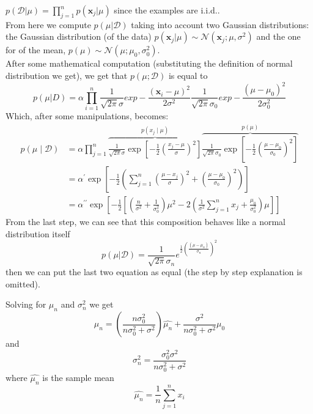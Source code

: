 $p(\mathcal{D}|\mu)=\prod_{j=1}^{n}p(\pmb{x}_{j}|\mu)$ since the examples are i.i.d..\\

From here we compute $p(\mu|\mathcal{D})$ taking into account two Gaussian distributions:
the Gaussian distribution (of the data)
$p(\pmb{x}_{j}| \mu) \sim \mathcal{N}(\pmb{x}_{j}; \mu, \sigma^{2})$ and the one
for of the mean, $p(\mu) \sim \mathcal{N}(\mu ; \mu_{0}, \sigma_{0}^{2})$.\\ After
some mathematical computation (substituting the definition of normal
distribution we get), we get that $p(\mu;\mathcal{D})$ is equal to
\[
	p(\mu | D) = \alpha \prod_{i=1}^{n}\frac{1}{\sqrt{2 \pi} \sigma}\mathit{exp}- \frac{(\pmb{x}_{i}-\mu)^{2}}{2
	\sigma^{2}}\frac{1}{\sqrt{2 \pi}\sigma_{0}}\mathit{exp}- \frac{(\mu - \mu_{0})^{2}}{2
	\sigma_{0}^{2}}
\]
Which, after some manipulations, becomes:
\[
	\begin{aligned}
		p(\mu \mid \mathcal{D}) & =\alpha \prod_{j=1}^{n} \overbrace{\frac{1}{\sqrt{2 \pi} \sigma} \exp \left[-\frac{1}{2}\left(\frac{x_j-\mu}{\sigma}\right)^2\right]}^{p\left(x_j \mid \mu\right)}\overbrace{\frac{1}{\sqrt{2 \pi} \sigma_0} \exp \left[-\frac{1}{2}\left(\frac{\mu-\mu_0}{\sigma_0}\right)^2\right]}^{p(\mu)} \\
		                        & =\alpha^{\prime}\exp \left[-\frac{1}{2}\left(\sum_{j=1}^{n}\left(\frac{\mu-x_j}{\sigma}\right)^{2}+\left(\frac{\mu-\mu_0}{\sigma_0}\right)^{2}\right)\right]                                                                                                                                   \\
		                        & =\alpha^{\prime \prime}\exp \left[-\frac{1}{2}\left[\left(\frac{n}{\sigma^2}+\frac{1}{\sigma_0^2}\right) \mu^{2}-2\left(\frac{1}{\sigma^2}\sum_{j=1}^{n} x_{j}+\frac{\mu_0}{\sigma_0^2}\right) \mu\right]\right]
	\end{aligned}
\]
From the last step, we can see that this composition behaves like a normal
distribution itself
\[
	p(\mu|\mathcal{D}) = \frac{1}{\sqrt{2\pi}\sigma_{n}}e^{\frac{1}{2} (\frac{(\mu
	- \mu_{n})}{\sigma_{n}})^2}
\]
then we can put the last two equation as equal (the step by step explanation is omitted).

Solving for $\mu_{n}$ and $\sigma_{n}^{2}$ we get
\[
	\mu_{n}= \left( \frac{n\sigma_{0}^{2}}{n\sigma_{0}^{2}+ \sigma^{2}}\right) \hat
	{\mu_n}+ \frac{\sigma^{2}}{n\sigma_{0}^{2}+ \sigma^{2}}\mu_{0}
\]
and
\[
	\sigma_{n}^{2}= \frac{\sigma_{0}^{2}\sigma^{2}}{n\sigma_{0}^{2}+ \sigma^{2}}
\]
where $\hat{\mu_n}$ is the sample mean
\[
	\hat{\mu_n}= \frac{1}{n}\sum_{j=1}^{n}x_{i}
\]

